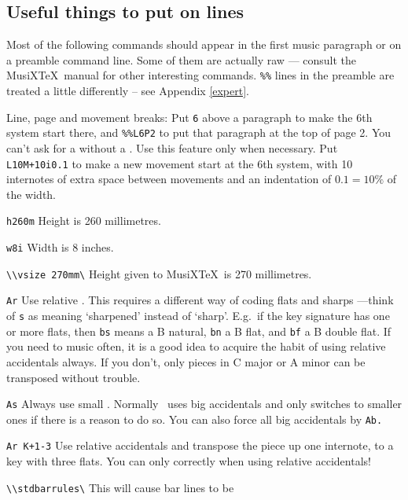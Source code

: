 \documentclass[11pt]{article}
\begin{document}
\subsection{Useful things to put on \ttxem{\%\%} lines}
\label{usefulPMX}

Most of the following commands should appear in the first music paragraph
or on a  preamble command line.
Some of them are actually raw  ---
consult the MusiX\TeX\ manual for other interesting commands.
\verb"%%" lines in the preamble are treated a little differently -- see 
Appendix \ref{expert}.
\begin{description}
 \item{Line, page and movement breaks:}  
Put \texttt{6} above a paragraph
to make the 6th system start there, and \verb'%%L6P2'  to put that
paragraph at the top of page 2.  You can't ask for a 
without a .  Use this feature only when necessary.  
Put \verb'L10M+10i0.1' to make a new movement start at the 6th system,
with 10 internotes of extra space between movements and an indentation
of $0.1=10\%$ of the width.
 \item{\verb"h260m"} Height is 260 millimetres.
 \item{\verb"w8i"} Width is 8 inches.
 \item{\verb"\\vsize 270mm\"} Height given to MusiX\TeX\ is 270 millimetres. 
 \item{\verb"Ar"}  Use relative .  This requires a different 
  way of coding flats and sharps ---think of \verb's' as meaning 
  `sharpened' instead of `sharp'.  E.g.~if the key signature has one or 
  more flats, then \verb'bs' means a B natural, \verb'bn' a B flat, and 
  \verb'bf' a B double flat.   If you need to  music often, 
  it is a good idea to acquire the habit of using relative accidentals 
  always.  If you don't, only pieces in C major or A minor can be 
  transposed without trouble. 
 \item{\verb"As"}  Always use small .  Normally \PMX\
uses big accidentals and only switches to smaller ones if there is a
reason to do so.  You can also force all big accidentals by \verb"Ab."
 \item{\verb"Ar K+1-3"}  Use relative accidentals and transpose the 
  piece up one internote, to a key with three flats.  You can only 
  \ixem{transpose} correctly when using relative accidentals! 
 \item{\verb"\\stdbarrules\"}  This will cause bar lines to be 

\end{description}
\end{document}
